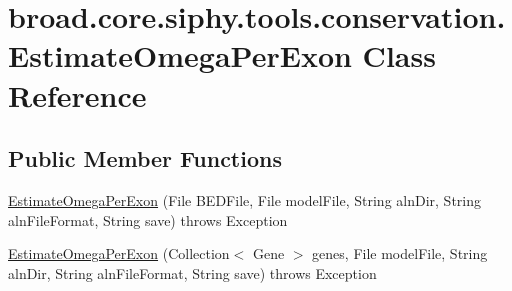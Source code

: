 \hypertarget{classbroad_1_1core_1_1siphy_1_1tools_1_1conservation_1_1_estimate_omega_per_exon}{\section{broad.\+core.\+siphy.\+tools.\+conservation.\+Estimate\+Omega\+Per\+Exon Class Reference}
\label{classbroad_1_1core_1_1siphy_1_1tools_1_1conservation_1_1_estimate_omega_per_exon}
}
\subsection*{Public Member Functions}
\begin{DoxyCompactItemize}
\item 
\hyperlink{classbroad_1_1core_1_1siphy_1_1tools_1_1conservation_1_1_estimate_omega_per_exon_ae4600430dbda5b3075ed636f5a6c584b}{Estimate\+Omega\+Per\+Exon} (File B\+E\+D\+File, File model\+File, String aln\+Dir, String aln\+File\+Format, String save)  throws Exception
\item 
\hyperlink{classbroad_1_1core_1_1siphy_1_1tools_1_1conservation_1_1_estimate_omega_per_exon_ae5e22373e54b5fa7e94f6de010000cad}{Estimate\+Omega\+Per\+Exon} (Collection$<$ Gene $>$ genes, File model\+File, String aln\+Dir, String aln\+File\+Format, String save)  throws Exception
\end{DoxyCompactItemize}

